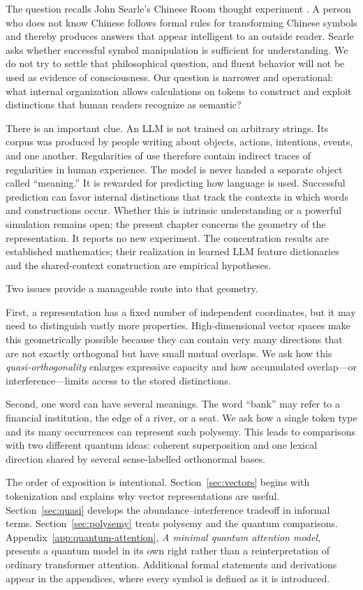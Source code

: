 \documentclass[
  aps,
  reprint,
  superscriptaddress,
  floatfix,
  nofootinbib,
  longbibliography
]{revtex4-2}
\begin{document}
The question recalls John Searle's Chinese Room thought experiment
\cite{searl-80a}.  A person who does not know Chinese follows formal rules for
transforming Chinese symbols and thereby produces answers that appear
intelligent to an outside reader.  Searle asks whether successful symbol
manipulation is sufficient for understanding.  We do not try to settle that
philosophical question, and fluent behavior will not be used as evidence of
consciousness.  Our question is narrower and operational: what internal
organization allows calculations on tokens to construct and exploit distinctions that
human readers recognize as semantic?

There is an important clue.  An LLM is not trained on arbitrary strings.
Its corpus was produced by people writing about objects, actions, intentions,
events, and one another.  Regularities of use therefore contain indirect
traces of regularities in human experience.  The model is never handed a
separate object called ``meaning.''  It is rewarded for predicting how
language is used.  Successful prediction can favor internal distinctions that
track the contexts in which words and constructions occur.  Whether this is
intrinsic understanding or a powerful simulation remains open; the present
chapter concerns the geometry of the representation.  It reports no new
experiment.  The concentration results are established mathematics; their
realization in learned LLM feature dictionaries and the shared-context
construction are empirical hypotheses.

Two issues provide a manageable route into that geometry.

First, a representation has a fixed number of independent coordinates, but it
may need to distinguish vastly more properties.  High-dimensional vector
spaces make this geometrically possible because they can contain very many directions that
are not exactly orthogonal but have small mutual overlaps.  We ask how this
\emph{quasi-orthogonality} enlarges expressive capacity and how accumulated
overlap---or interference---limits access to the stored distinctions.

Second, one word can have several meanings.  The word ``bank'' may refer to a
financial institution, the edge of a river, or a seat.  We ask how a single
token type and its many occurrences can represent such polysemy.  This leads
to comparisons with two different quantum ideas: coherent superposition and
one lexical direction shared by several sense-labelled orthonormal bases.

The order of exposition is intentional.  Section~\ref{sec:vectors} begins
with tokenization and explains why vector representations are useful.
Section~\ref{sec:quasi} develops the abundance--interference tradeoff in
informal terms.  Section~\ref{sec:polysemy} treats polysemy and the quantum
comparisons.  Appendix~\ref{app:quantum-attention}, \emph{A minimal quantum
attention model}, presents a quantum model in its own right rather than a
reinterpretation of ordinary transformer attention.  Additional formal
statements and derivations appear in the
appendices, where every symbol is defined as it is introduced.
\end{document}
